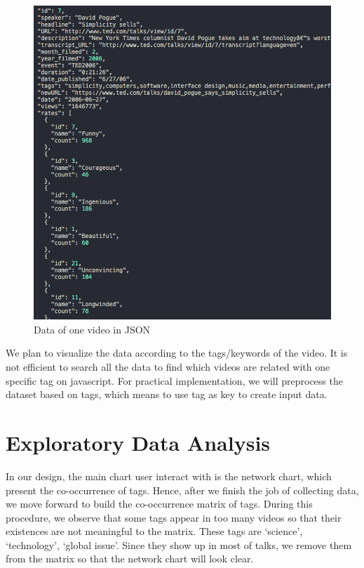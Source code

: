 \documentclass{report}
\numberwithin{figure}{section}
\begin{document}
\begin{figure} [h]
\begin{center}
\includegraphics[scale=0.4]{"onevideodata"}
\caption{Data of one video in JSON}
\label{fig:jsonofvideo}
\end{center}
\end{figure}

\quad We plan to visualize the data according to the tags/keywords of the video. It is not efficient to search all the data to find which videos are related with one specific tag on javascript. For practical implementation, we will preprocess the dataset based on tags, which means to use tag as key to create input data.

\section{Exploratory Data Analysis}

\quad In our design, the main chart user interact with is the network chart, which present the co-occurrence of tags. Hence, after we finish the job of collecting data, we move forward to build the co-occurrence matrix of tags. During this procedure, we observe that some tags appear in too many videos so that their existences are not meaningful to the matrix. These tags are `science', `technology', `global issue'. Since they show up in most of talks, we remove them from the matrix so that the network chart will look clear.
\end{document}
